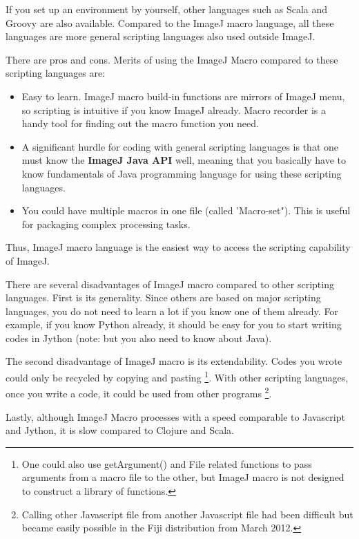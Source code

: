 \documentclass[11pt,a4paper,oneside]{report}
\begin{document}
If you set up an environment by yourself, other languages such as Scala and Groovy are also available. 
Compared to the ImageJ macro language, all these languages are more general scripting languages also used outside ImageJ. 

There are pros and cons. Merits of using the ImageJ Macro compared to these scripting languages are: 
\begin{itemize}
\item Easy to learn. 
ImageJ macro build-in functions are mirrors of ImageJ menu, so scripting is intuitive if you know ImageJ already. 
Macro recorder is a handy tool for finding out the macro function you need. 

\item A significant hurdle for coding with general scripting languages is that one must know the 
\textbf{ImageJ Java API} well, meaning that you basically have to know 
fundamentals of Java programming language for using these scripting languages. 

\item You could have multiple macros in one file (called 'Macro-set"). 
This is useful for packaging complex processing tasks.

\end{itemize}

Thus, ImageJ macro language is the easiest way to access the scripting
capability of ImageJ.

There are several disadvantages of ImageJ macro compared to other
scripting languages. First is its generality. Since others are based on major scripting languages, you do not need to learn a lot if you know one of them already. For example, if you know Python already, 
it should be easy for you to start writing codes in Jython (note: but you also need to know about Java). 

The second disadvantage of ImageJ macro is its extendability.
Codes you wrote could only be recycled by copying and pasting
\footnote{One could also use getArgument() and File related functions to pass
arguments from a macro file to the other, but ImageJ macro is not designed to
construct a library of functions.}.
With other scripting languages, once you write a code, it could be used from other programs
\footnote{ Calling other Javascript file from another Javascript file had been difficult but became easily possible in the Fiji distribution from March 2012.}.

Lastly, although ImageJ Macro processes with a speed comparable to
Javascript and Jython, it is slow compared to Clojure and Scala. 
\end{document}
